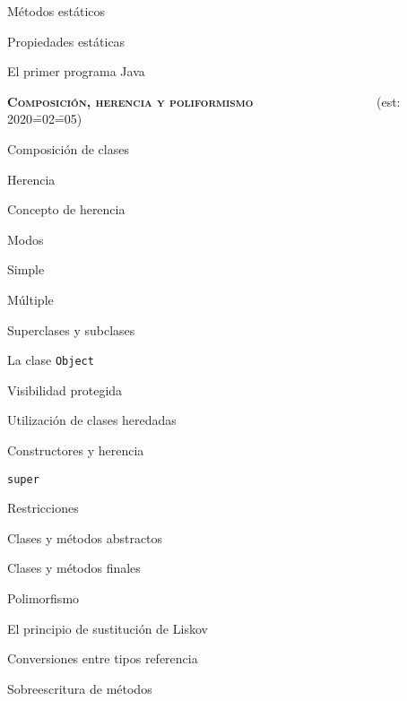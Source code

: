 \begin{longenum}
\begin{longenum}
\begin{longenum}
            \item Métodos estáticos
            \item Propiedades estáticas
        \end{longenum}
        \item El primer programa Java
    \end{longenum}
    \item \textbf{\textsc{Composición, herencia y poliformismo}} \ \ \ \ \ \ \ \ \ \ \ \ \ \ \ \ \ \ \ (est: 2020\==02\==05)
    \begin{longenum}
        \item Composición de clases
        \item Herencia
        \begin{longenum}
            \item Concepto de herencia
            \item Modos
            \begin{longenum}
                \item Simple
                \item Múltiple
            \end{longenum}
            \item Superclases y subclases
            \item La clase \texttt{Object}
            \item Visibilidad protegida
            \item Utilización de clases heredadas
            \item Constructores y herencia
            \item \texttt{super}
            \item Restricciones
            \begin{longenum}
                \item Clases y métodos abstractos
                \item Clases y métodos finales
            \end{longenum}
        \end{longenum}
        \item Polimorfismo
        \begin{longenum}
            \item El principio de sustitución de Liskov
            \item Conversiones entre tipos referencia
            \item Sobreescritura de métodos

\end{longenum}
\end{longenum}
\end{longenum}
